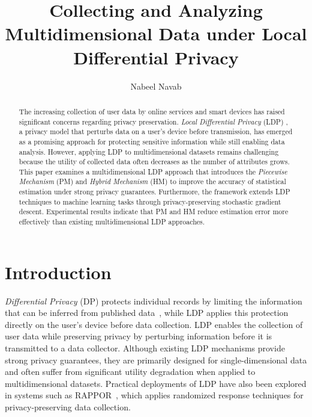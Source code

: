 \documentclass[sigconf]{acmart}
\begin{document}
\title{Collecting and Analyzing Multidimensional Data under Local Differential Privacy}

\author{Nabeel Navab}

\begin{abstract}
The increasing collection of user data by online services and smart devices has raised significant concerns regarding privacy preservation. \textit{Local Differential Privacy}  (LDP) , a privacy model that perturbs data on a user's device before transmission, has emerged as a promising approach for protecting sensitive information while still enabling data analysis. However, applying LDP to multidimensional datasets remains challenging because the utility of collected data often decreases as the number of attributes grows. This paper examines a multidimensional LDP approach that introduces the \textit{Piecewise Mechanism} (PM) and \textit{Hybrid Mechanism} (HM) to improve the accuracy of statistical estimation under strong privacy guarantees. Furthermore, the framework extends LDP techniques to machine learning tasks through privacy-preserving stochastic gradient descent. Experimental results indicate that PM and HM reduce estimation error more effectively than existing multidimensional LDP approaches.




\end{abstract} 

\maketitle
\thispagestyle{empty}
\pagestyle{empty}
\markboth{}{}

\section{Introduction}

\textit{Differential Privacy} (DP) protects individual records by limiting the information that can be inferred from published data~\cite{dwork2006}, while LDP applies this protection directly on the user's device before data collection. LDP enables the collection of user data while preserving privacy by perturbing information before it is transmitted to a data collector.
 Although existing LDP mechanisms provide strong privacy guarantees, they are primarily designed for single-dimensional data and often suffer from significant utility degradation when applied to multidimensional datasets. Practical deployments of LDP have also been explored in systems such as RAPPOR~\cite{rappor2014}, which applies randomized response techniques for privacy-preserving data collection.
\end{document}
